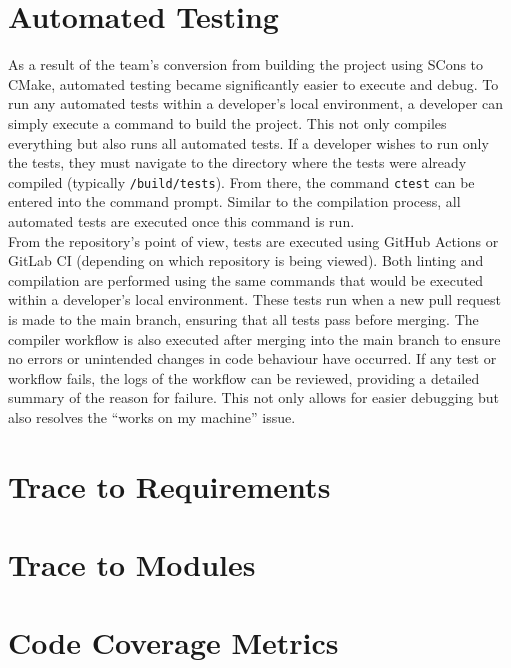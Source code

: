 \documentclass[12pt, titlepage]{article}
\begin{document}
\section{Automated Testing}

As a result of the team’s conversion from building the project using SCons to CMake, automated testing became significantly easier to execute and debug.
To run any automated tests within a developer’s local environment, a developer can simply execute a command to build the project. 
This not only compiles everything but also runs all automated tests. If a developer wishes to run only the tests, they must navigate to the directory where the tests were already compiled (typically \texttt{/build/tests}). 
From there, the command \texttt{ctest} can be entered into the command prompt. Similar to the compilation process, all automated tests are executed once this command is run.\\

From the repository’s point of view, tests are executed using GitHub Actions or GitLab CI (depending on which repository is being viewed). 
Both linting and compilation are performed using the same commands that would be executed within a developer’s local environment. These tests run when a new pull request is made to the main branch, ensuring that all tests pass before merging.
The compiler workflow is also executed after merging into the main branch to ensure no errors or unintended changes in code behaviour have occurred. If any test or workflow fails, the logs of the workflow can be reviewed, providing a detailed summary of the reason for failure. 
This not only allows for easier debugging but also resolves the “works on my machine” issue.
		
\section{Trace to Requirements}
		
\section{Trace to Modules}		

\section{Code Coverage Metrics}




\newpage{}
\end{document}
